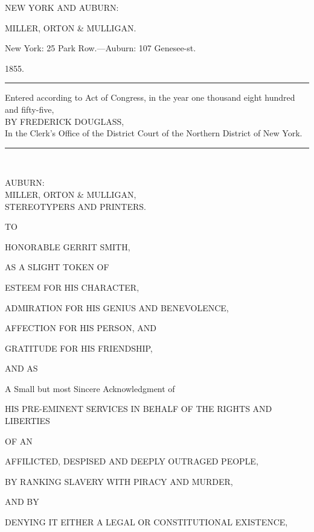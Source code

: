 {NEW YORK AND AUBURN:}

{{MILLER, ORTON \& MULLIGAN.}}

{New York: 25 Park Row.---Auburn: 107 Genesee-st.}

1855.

{\protect\hypertarget{ux5cux7bux5cux7bux5cux7b1ux5cux7dux5cux7dux5cux7d}{}{}}

{}

\begin{center}\rule{0.5\linewidth}{\linethickness}\end{center}

{Entered according to Act of Congress, in the year one thousand eight
hundred and fifty-five,}\\
{BY FREDERICK DOUGLASS,}\\
{In the Clerk's Office of the District Court of the Northern District of
New York.}

\begin{center}\rule{0.5\linewidth}{\linethickness}\end{center}

~

{AUBURN:}\\
{{MILLER, ORTON \& MULLIGAN,}}\\
{STEREOTYPERS AND PRINTERS.}

{\protect\hypertarget{ux5cux7bux5cux7bux5cux7b1ux5cux7dux5cux7dux5cux7d}{}{}}

{}

TO

{{HONORABLE GERRIT SMITH,}}

{AS A SLIGHT TOKEN OF}

{ESTEEM FOR HIS CHARACTER},

{ADMIRATION FOR HIS GENIUS AND BENEVOLENCE,}

AFFECTION FOR HIS PERSON, AND

{{GRATITUDE FOR HIS FRIENDSHIP},}

{AND AS}

{\textgerman{A Small but most Sincere Acknowledgment of}}

{HIS PRE-EMINENT SERVICES IN BEHALF OF THE RIGHTS AND LIBERTIES}

{OF AN}

AFFILICTED, DESPISED AND DEEPLY OUTRAGED PEOPLE,

{BY RANKING SLAVERY WITH PIRACY AND MURDER,}

{AND BY}

DENYING IT EITHER A LEGAL OR CONSTITUTIONAL EXISTENCE,

